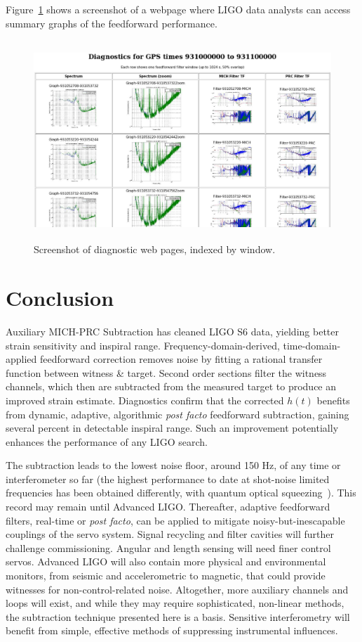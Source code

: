  Figure~\ref{diagnosticWebpages} shows a screenshot of a webpage where LIGO data analysts can access summary graphs of the feedforward performance.

\begin{figure}
\begin{center}
\includegraphics[height=75mm, width=150mm]{figure16.eps}
\caption{Screenshot of diagnostic web pages, indexed by window.}
\label{diagnosticWebpages}
\end{center}
\end{figure}


\section{Conclusion}

Auxiliary MICH-PRC Subtraction has cleaned LIGO S6 data, yielding better strain sensitivity and inspiral range. Frequency-domain-derived, time-domain-applied feedforward correction removes noise by fitting a rational transfer function between witness \& target. Second order sections filter the witness channels, which then are subtracted from the measured target to produce an improved strain estimate. Diagnostics confirm that the corrected $h(t)$ benefits from dynamic, adaptive, algorithmic \textit{post facto} feedforward subtraction, gaining several percent in detectable inspiral range. Such an improvement potentially enhances the performance of any LIGO search. 

The subtraction leads to the lowest noise floor, around 150 Hz, of any time or interferometer so far (the highest performance to date at shot-noise limited frequencies has been obtained differently, with quantum optical squeezing~\cite{BarsottiNatureSqueezing,DwyerPhaseNoise}). This record may remain until Advanced LIGO. Thereafter, adaptive feedforward filters, real-time or \textit{post facto}, can be applied to mitigate noisy-but-inescapable couplings of the servo system. Signal recycling and filter cavities will further challenge commissioning. Angular and length sensing will need finer control servos. Advanced LIGO will also contain more physical and environmental monitors, from seismic and accelerometric to magnetic, that could provide witnesses for non-control-related noise. Altogether, more auxiliary channels and loops will exist, and while they may require sophisticated, non-linear methods, the subtraction technique presented here is a basis. Sensitive interferometry will benefit from simple, effective methods of suppressing instrumental influences.

